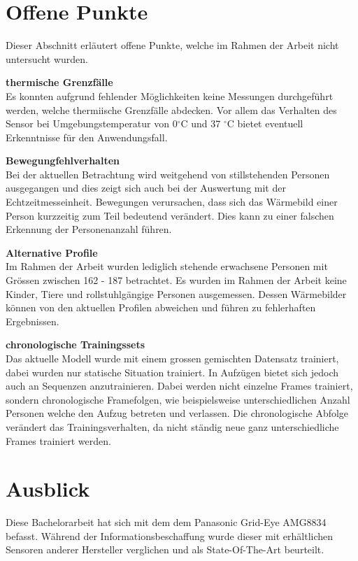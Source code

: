 \section{Offene Punkte}
\label{sec:OffenePunkte}
Dieser Abschnitt erläutert offene Punkte, welche im Rahmen der Arbeit nicht untersucht wurden.

\textbf{thermische Grenzfälle}\\
Es konnten aufgrund fehlender Möglichkeiten keine Messungen durchgeführt werden, welche thermiische Grenzfälle abdecken. Vor allem das Verhalten des Sensor bei Umgebungstemperatur von 0$ ^\circ$C und 37 $^\circ$C bietet eventuell Erkenntnisse für den Anwendungsfall.

\textbf{Bewegungfehlverhalten}\\
Bei der aktuellen Betrachtung wird weitgehend von stillstehenden Personen ausgegangen und dies zeigt sich auch bei der Auswertung mit der Echtzeitmesseinheit. Bewegungen verursachen, dass sich das Wärmebild einer Person kurzzeitig zum Teil bedeutend verändert. Dies kann zu einer falschen Erkennung der Personenanzahl führen. 

\textbf{Alternative Profile}\\
Im Rahmen der Arbeit wurden lediglich stehende erwachsene Personen mit Grössen zwischen 162 - 187 betrachtet. Es wurden im Rahmen der Arbeit keine Kinder, Tiere und rollstuhlgängige Personen ausgemessen. Dessen Wärmebilder können von den aktuellen Profilen abweichen und führen zu fehlerhaften Ergebnissen.

\textbf{chronologische Trainingssets}\\
Das aktuelle Modell wurde mit einem grossen gemischten Datensatz trainiert, dabei wurden nur statische Situation trainiert. In Aufzügen bietet sich jedoch auch an Sequenzen anzutrainieren. Dabei werden nicht einzelne Frames trainiert, sondern chronologische Framefolgen, wie beispielsweise unterschiedlichen Anzahl Personen welche den Aufzug betreten und verlassen. Die chronologische Abfolge verändert das Trainingsverhalten, da nicht ständig neue ganz unterschiedliche Frames trainiert werden.


\section{Ausblick}
\label{sec:Ausblick}
Diese Bachelorarbeit hat sich mit dem dem Panasonic Grid-Eye AMG8834 befasst. Während der Informationsbeschaffung wurde dieser mit erhältlichen Sensoren anderer Hersteller verglichen und als State-Of-The-Art beurteilt. 

